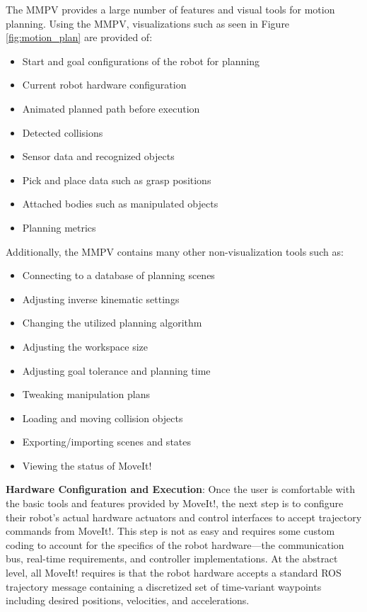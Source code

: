 \documentclass[10pt,journal,compsoc]{joser1}
\begin{document}
{The MMPV provides a large number of features and visual tools for motion planning. Using the MMPV, visualizations such as seen in Figure \ref{fig:motion_plan} are provided of:

\begin{itemize}
    \item Start and goal configurations of the robot for planning
    \item Current robot hardware configuration
    \item Animated planned path before execution
    \item Detected collisions
    \item Sensor data and recognized objects
    \item Pick and place data such as grasp positions
    \item Attached bodies such as manipulated objects
    \item Planning metrics
\end{itemize}

Additionally, the MMPV contains many other non-visualization tools such as:
\begin{itemize}
    \item Connecting to a database of planning scenes
    \item Adjusting inverse kinematic settings
    \item Changing the utilized planning algorithm
    \item Adjusting the workspace size
    \item Adjusting goal tolerance and planning time
    \item Tweaking manipulation plans
    \item Loading and moving collision objects
    \item Exporting/importing scenes and states
    \item Viewing the status of MoveIt!
\end{itemize}

{\bf Hardware Configuration and Execution}: Once the user is comfortable with the basic tools and features provided by MoveIt!, the next step is to configure their robot's actual hardware actuators and control interfaces to accept trajectory commands from MoveIt!. This step is not as easy and requires some custom coding to account for the specifics of the robot hardware---the communication bus, real-time requirements, and controller implementations. At the abstract level, all MoveIt! requires is that the robot hardware accepts a standard ROS trajectory message containing a discretized set of time-variant waypoints including desired positions, velocities, and accelerations.  

}
\end{document}
